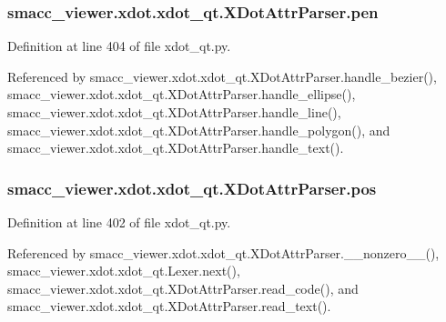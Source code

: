 \subsubsection[{\texorpdfstring{pen}{pen}}]{\setlength{\rightskip}{0pt plus 5cm}smacc\+\_\+viewer.\+xdot.\+xdot\+\_\+qt.\+X\+Dot\+Attr\+Parser.\+pen}\hypertarget{classsmacc__viewer_1_1xdot_1_1xdot__qt_1_1XDotAttrParser_a22ec4e08bbdb0ba31a8b5e09db560d8c}{}\label{classsmacc__viewer_1_1xdot_1_1xdot__qt_1_1XDotAttrParser_a22ec4e08bbdb0ba31a8b5e09db560d8c}


Definition at line 404 of file xdot\+\_\+qt.\+py.



Referenced by smacc\+\_\+viewer.\+xdot.\+xdot\+\_\+qt.\+X\+Dot\+Attr\+Parser.\+handle\+\_\+bezier(), smacc\+\_\+viewer.\+xdot.\+xdot\+\_\+qt.\+X\+Dot\+Attr\+Parser.\+handle\+\_\+ellipse(), smacc\+\_\+viewer.\+xdot.\+xdot\+\_\+qt.\+X\+Dot\+Attr\+Parser.\+handle\+\_\+line(), smacc\+\_\+viewer.\+xdot.\+xdot\+\_\+qt.\+X\+Dot\+Attr\+Parser.\+handle\+\_\+polygon(), and smacc\+\_\+viewer.\+xdot.\+xdot\+\_\+qt.\+X\+Dot\+Attr\+Parser.\+handle\+\_\+text().

\subsubsection[{\texorpdfstring{pos}{pos}}]{\setlength{\rightskip}{0pt plus 5cm}smacc\+\_\+viewer.\+xdot.\+xdot\+\_\+qt.\+X\+Dot\+Attr\+Parser.\+pos}\hypertarget{classsmacc__viewer_1_1xdot_1_1xdot__qt_1_1XDotAttrParser_a5a7b9b451f084464b7b49f6c26e18b2a}{}\label{classsmacc__viewer_1_1xdot_1_1xdot__qt_1_1XDotAttrParser_a5a7b9b451f084464b7b49f6c26e18b2a}


Definition at line 402 of file xdot\+\_\+qt.\+py.



Referenced by smacc\+\_\+viewer.\+xdot.\+xdot\+\_\+qt.\+X\+Dot\+Attr\+Parser.\+\_\+\+\_\+nonzero\+\_\+\+\_\+(), smacc\+\_\+viewer.\+xdot.\+xdot\+\_\+qt.\+Lexer.\+next(), smacc\+\_\+viewer.\+xdot.\+xdot\+\_\+qt.\+X\+Dot\+Attr\+Parser.\+read\+\_\+code(), and smacc\+\_\+viewer.\+xdot.\+xdot\+\_\+qt.\+X\+Dot\+Attr\+Parser.\+read\+\_\+text().

